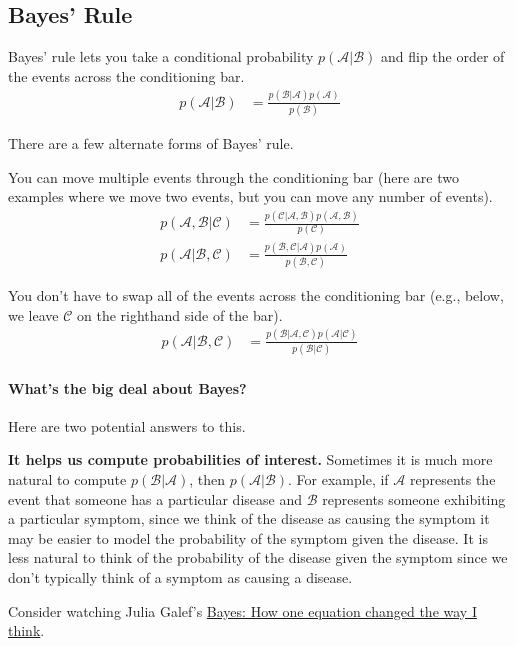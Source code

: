 \documentclass{tufte-handout}
\begin{document}
\subsection{Bayes' Rule}

Bayes' rule lets you take a conditional probability $p(\mathcal{A}|\mathcal{B})$ and flip the order of the events across the conditioning bar.
\begin{align}
p(\mathcal{A}|\mathcal{B}) &= \frac{p(\mathcal{B}|\mathcal{A}) p(\mathcal{A})}{p(\mathcal{B})}
\end{align}

There are a few alternate forms of Bayes' rule.
\bi
\item You can move multiple events through the conditioning bar (here are two examples where we move two events, but you can move any number of events).
\begin{align}
p(\mathcal{A}, \mathcal{B} | \mathcal{C}) &= \frac{p(\mathcal{C}|\mathcal{A}, \mathcal{B}) p(\mathcal{A}, \mathcal{B})}{p(\mathcal{C})} \\
p(\mathcal{A} |  \mathcal{B}, \mathcal{C}) &= \frac{p(\mathcal{B}, \mathcal{C}|\mathcal{A}) p(\mathcal{A})}{p(\mathcal{B}, \mathcal{C})}
\end{align}
\item You don't have to swap all of the events across the conditioning bar (e.g., below, we leave $\mathcal{C}$ on the righthand side of the bar).
\begin{align}
p(\mathcal{A}|\mathcal{B},\mathcal{C}) &= \frac{p(\mathcal{B} | \mathcal{A}, \mathcal{C}) p(\mathcal{A}|\mathcal{C})}{p(\mathcal{B}|\mathcal{C})}
\end{align}
\ei


\paragraph{What's the big deal about Bayes?}
Here are two potential answers to this.
\bi
\item \textbf{It helps us compute probabilities of interest.}  Sometimes it is much more natural to compute $p(\mathcal{B} | \mathcal{A})$, then $p(\mathcal{A} | \mathcal{B})$.  For example, if $\mathcal{A}$ represents the event that someone has a particular disease and $\mathcal{B}$ represents someone exhibiting a particular symptom, since we think of the disease as causing the symptom it may be easier to model the probability of the symptom given the disease.  It is less natural to think of the probability of the disease given the symptom since we don't typically think of a symptom as causing a disease.
\item Consider watching Julia Galef's \href{https://www.youtube.com/watch?v=za7RqnT7CM0}{Bayes: How one equation changed the way I think}.
\ei
\end{document}
